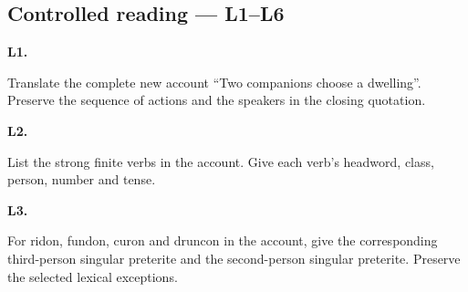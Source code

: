 \par\begin{minipage}{\linewidth}\raggedright
{}
\end{minipage}\par

\subsection*{Controlled reading — L1–L6}

\par\begin{minipage}{\linewidth}\raggedright
\textbf{L1.}

Translate the complete new account “Two companions choose a dwelling”. Preserve the sequence of actions and the speakers in the closing quotation.

\end{minipage}\par\addvspace{4pt}

\par\begin{minipage}{\linewidth}\raggedright
\textbf{L2.}

List the strong finite verbs in the account. Give each verb’s headword, class, person, number and tense.

\end{minipage}\par\addvspace{4pt}

\par\begin{minipage}{\linewidth}\raggedright
\textbf{L3.}

For ridon, fundon, curon and druncon in the account, give the corresponding third-person singular preterite and the second-person singular preterite. Preserve the selected lexical exceptions.

\end{minipage}\par\addvspace{4pt}


